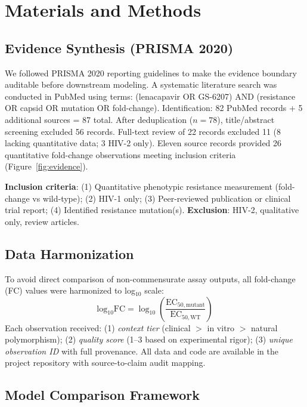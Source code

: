 \documentclass[preprint,authoryear]{elsarticle}
\begin{document}
\section{Materials and Methods}

\subsection{Evidence Synthesis (PRISMA 2020)}

We followed PRISMA 2020 reporting guidelines \cite{Page2021} to make the evidence boundary auditable before downstream modeling. A systematic literature search was conducted in PubMed using terms: (lenacapavir OR GS-6207) AND (resistance OR capsid OR mutation OR fold-change). Identification: 82 PubMed records + 5 additional sources = 87 total. After deduplication ($n=78$), title/abstract screening excluded 56 records. Full-text review of 22 records excluded 11 (8 lacking quantitative data; 3 HIV-2 only). Eleven source records provided 26 quantitative fold-change observations meeting inclusion criteria (Figure~\ref{fig:evidence}).

\textbf{Inclusion criteria}: (1) Quantitative phenotypic resistance measurement (fold-change vs wild-type); (2) HIV-1 only; (3) Peer-reviewed publication or clinical trial report; (4) Identified resistance mutation(s). \textbf{Exclusion}: HIV-2, qualitative only, review articles.

\subsection{Data Harmonization}

To avoid direct comparison of non-commensurate assay outputs, all fold-change (FC) values were harmonized to log$_{10}$ scale:
\begin{equation}
\text{log}_{10}\text{FC} = \log_{10}\left(\frac{\text{EC}_{50,\text{mutant}}}{\text{EC}_{50,\text{WT}}}\right)
\end{equation}
Each observation received: (1) \textit{context tier} (clinical $>$ in vitro $>$ natural polymorphism); (2) \textit{quality score} (1--3 based on experimental rigor); (3) \textit{unique observation ID} with full provenance. All data and code are available in the project repository with source-to-claim audit mapping.

\subsection{Model Comparison Framework}
\end{document}
